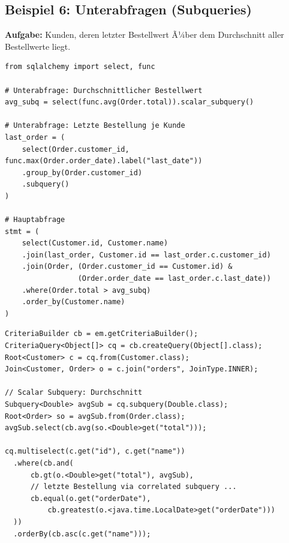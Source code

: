 \subsection{Beispiel 6: Unterabfragen (Subqueries)}
\label{subsec:bsp6}

\textbf{Aufgabe:} Kunden, deren letzter Bestellwert Ã¼ber dem Durchschnitt
aller Bestellwerte liegt.

\begin{lstlisting}[style=pythonstyle, caption={Beispiel 6 -- Python (Subquery)},
  label=lst:bsp6_py]
from sqlalchemy import select, func

# Unterabfrage: Durchschnittlicher Bestellwert
avg_subq = select(func.avg(Order.total)).scalar_subquery()

# Unterabfrage: Letzte Bestellung je Kunde
last_order = (
    select(Order.customer_id, func.max(Order.order_date).label("last_date"))
    .group_by(Order.customer_id)
    .subquery()
)

# Hauptabfrage
stmt = (
    select(Customer.id, Customer.name)
    .join(last_order, Customer.id == last_order.c.customer_id)
    .join(Order, (Order.customer_id == Customer.id) &
                 (Order.order_date == last_order.c.last_date))
    .where(Order.total > avg_subq)
    .order_by(Customer.name)
)
\end{lstlisting}

\begin{lstlisting}[style=javastyle, caption={Beispiel 6 -- Java (Subquery)},
  label=lst:bsp6_java]
CriteriaBuilder cb = em.getCriteriaBuilder();
CriteriaQuery<Object[]> cq = cb.createQuery(Object[].class);
Root<Customer> c = cq.from(Customer.class);
Join<Customer, Order> o = c.join("orders", JoinType.INNER);

// Scalar Subquery: Durchschnitt
Subquery<Double> avgSub = cq.subquery(Double.class);
Root<Order> so = avgSub.from(Order.class);
avgSub.select(cb.avg(so.<Double>get("total")));

cq.multiselect(c.get("id"), c.get("name"))
  .where(cb.and(
      cb.gt(o.<Double>get("total"), avgSub),
      // letzte Bestellung via correlated subquery ...
      cb.equal(o.get("orderDate"),
          cb.greatest(o.<java.time.LocalDate>get("orderDate")))
  ))
  .orderBy(cb.asc(c.get("name")));
\end{lstlisting}

